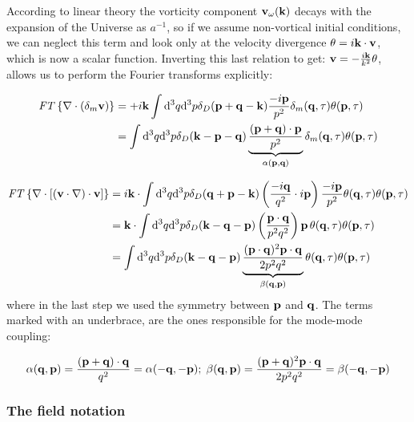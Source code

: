 According to linear theory the vorticity component $\mathbf{v{}_{\omega}}(\mathbf{k})$
decays with the expansion of the Universe as $a^{-1}$, so if we assume
non-vortical initial conditions, we can neglect this term and look
only at the velocity divergence $\theta=i\mathbf{k}\cdot\mathbf{v}$, which
is now a scalar function. Inverting this last relation to get: $\mathbf{v}=-\frac{i\mathbf{k}}{k^{2}}\theta$,
allows us to perform the Fourier transforms explicitly:

\begin{align*}
\mathit{FT}\left\{ \nabla\cdot(\delta_{m}\mathbf{v})\right\}  & =+i\mathbf{k}\int\mathrm{d}^{3}q\mathrm{d}^{3}p\delta_{D}(\mathbf{p}+\mathbf{q}-\mathbf{k})\frac{-i\mathbf{p}}{p^{2}}\delta_{m}(\mathbf{q},\tau)\theta(\mathbf{p},\tau)\\
 & =\int\mathrm{d}^{3}q\mathrm{d}^{3}p\delta_{D}(\mathbf{k}-\mathbf{p}-\mathbf{q})\underbrace{\frac{\left(\mathbf{p}+\mathbf{q}\right)\cdot\mathbf{p}}{p^{2}}}_{\alpha(\mathbf{p},\mathbf{q})}\delta_{m}(\mathbf{q},\tau)\theta(\mathbf{p},\tau)
\end{align*}


\begin{align*}
\mathit{FT}\left\{ \nabla\cdot\left[\left(\mathbf{v}\cdot\nabla\right)\cdot\mathbf{v}\right]\right\}  & =i\mathbf{k}\cdot\int\mathrm{d}^{3}q\mathrm{d}^{3}p\delta_{D}(\mathbf{q}+\mathbf{p}-\mathbf{k})\left(\frac{-i\mathbf{q}}{q^{2}}\cdot i\mathbf{p}\right)\frac{-i\mathbf{p}}{p^{2}}\theta(\mathbf{q},\tau)\theta(\mathbf{p},\tau)\\
 & =\mathbf{k}\cdot\int\mathrm{d}^{3}q\mathrm{d}^{3}p\delta_{D}(\mathbf{k}-\mathbf{q}-\mathbf{p})\left(\frac{\mathbf{p}\cdot\mathbf{q}}{p^{2}q^{2}}\right)\mathbf{p}\,\theta(\mathbf{q},\tau)\theta(\mathbf{p},\tau)\\
 & =\int\mathrm{d}^{3}q\mathrm{d}^{3}p\delta_{D}(\mathbf{k}-\mathbf{q}-\mathbf{p})\underbrace{\frac{(\mathbf{p}\cdot\mathbf{q})^{2}\mathbf{p}\cdot\mathbf{q}}{2p^{2}q^{2}}}_{\beta(\mathbf{q},\mathbf{p})}\theta(\mathbf{q},\tau)\theta(\mathbf{p},\tau)
\end{align*}
where in the last step we used the symmetry between $\mathbf{p}$ and $\mathbf{q}$.
The terms marked with an underbrace, are the ones responsible for
the mode-mode coupling:

\begin{equation}
\alpha(\mathbf{q},\mathbf{p})=\frac{(\mathbf{p}+\mathbf{q})\cdot\mathbf{q}}{q^{2}}=\alpha(-\mathbf{q},-\mathbf{p});\;\beta(\mathbf{q},\mathbf{p})=\frac{(\mathbf{p}+\mathbf{q})^{2}\mathbf{p}\cdot\mathbf{q}}{2p^{2}q^{2}}=\beta(-\mathbf{q},-\mathbf{p})\label{eq:alpha-beta-func}
\end{equation}



\subsubsection{The field notation\label{sub:The-field-notation}}


